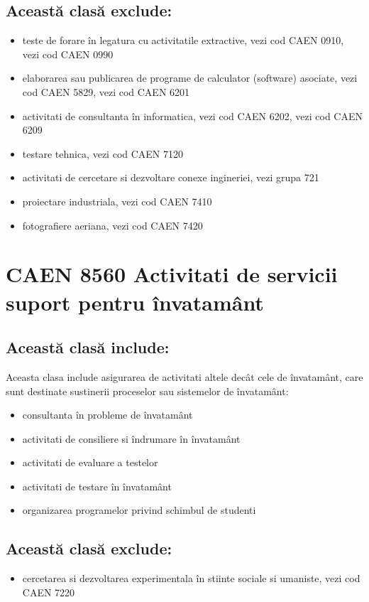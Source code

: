 \documentclass{article}
\begin{document}
\begin{multicols}{3}
\subsection*{Această clasă exclude:}
\begin{itemize}
\item teste de forare în legatura cu activitatile extractive, vezi cod CAEN 0910, vezi cod CAEN 0990
\item elaborarea sau publicarea de programe de calculator (software) asociate, vezi cod CAEN 5829, vezi cod CAEN 6201
\item activitati de consultanta în informatica, vezi cod CAEN 6202, vezi cod CAEN 6209
\item testare tehnica, vezi cod CAEN 7120
\item activitati de cercetare si dezvoltare conexe ingineriei, vezi grupa 721
\item proiectare industriala, vezi cod CAEN 7410
\item fotografiere aeriana, vezi cod CAEN 7420
\end{itemize}


\section*{CAEN 8560 Activitati de servicii suport pentru învatamânt}
\subsection*{Această clasă include:}
Aceasta clasa include asigurarea de activitati altele decât cele de învatamânt, care sunt destinate sustinerii proceselor sau sistemelor de învatamânt:
\begin{itemize}
\item consultanta în probleme de învatamânt
\item activitati de consiliere si îndrumare în învatamânt
\item activitati de evaluare a testelor
\item activitati de testare în învatamânt
\item organizarea programelor privind schimbul de studenti
\end{itemize}
\subsection*{Această clasă exclude:}
\begin{itemize}
  \item    cercetarea si dezvoltarea experimentala în stiinte sociale si umaniste, vezi cod CAEN 7220
\end{itemize}


\end{multicols}
\end{document}

